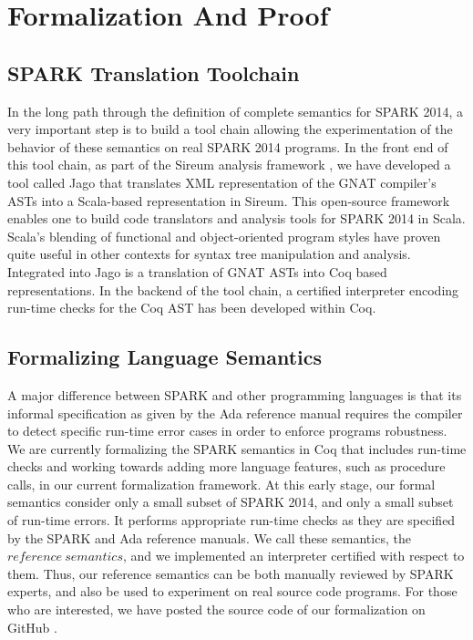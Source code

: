 \section{Formalization And Proof}

\subsection{SPARK Translation Toolchain}
In the long path through the definition of complete semantics for
SPARK 2014, a very important step is to build a tool chain allowing 
the experimentation of the behavior of these semantics on real SPARK
2014 programs. In the front end of this tool chain, as part of the 
Sireum analysis framework \cite{Sireum:URL}, we have developed a tool called Jago
\cite{Jago:URL} that translates XML representation of the GNAT compiler's 
ASTs into a Scala-based 
representation in Sireum.  This open-source framework enables one to build
code translators and analysis tools for SPARK 2014 in Scala.  Scala's 
blending of functional %
and object-oriented program styles have proven 
quite useful in other contexts for syntax tree manipulation and analysis.  
Integrated into Jago is a translation of GNAT ASTs into Coq based representations. 
In the backend of the tool chain, a certified interpreter 
encoding run-time checks for the Coq AST has been developed within Coq.

\subsection{Formalizing Language Semantics}
A major difference between SPARK and other programming languages is that 
its %
informal specification as given by the Ada reference manual requires the
compiler to detect specific run-time error cases in order to enforce
programs robustness.
We are currently formalizing the SPARK semantics in Coq that includes run-time checks 
and working towards adding more language features, such as procedure calls, in our current 
formalization framework.
At this early stage, our formal semantics consider only a small subset
of SPARK 2014, and only a small subset of run-time errors.  It performs 
appropriate run-time checks as they are specified by the SPARK and Ada 
reference manuals.  We call these semantics, the $\mathit{reference\
semantics}$, and we implemented an interpreter certified with respect to them.
Thus, our reference semantics can be both manually reviewed by SPARK 
experts, and also be used to experiment on real source code programs.
For those who are interested, we have posted the source code of our
formalization on GitHub \cite{Formalization:URL}.

